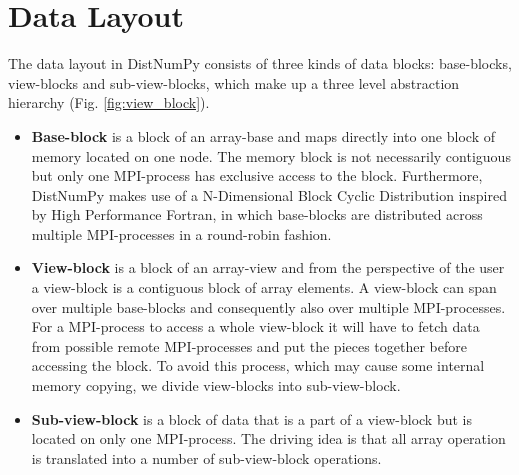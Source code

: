 \documentclass[preprint]{../PGAS10/sigplanconf}
\begin{document}
\section{Data Layout}
The data layout in DistNumPy consists of three kinds of data blocks: base-blocks, view-blocks and sub-view-blocks, which make up a three level abstraction hierarchy (Fig. \ref{fig:view_block}).

\begin{itemize}
\item \textbf{Base-block} is a block of an array-base and maps directly into one block of memory located on one node. The memory block is not necessarily contiguous but only one MPI-process has exclusive access to the block. Furthermore, DistNumPy makes use of a N-Dimensional Block Cyclic Distribution inspired by High Performance Fortran\cite{Loveman93}, in which base-blocks are distributed across multiple MPI-processes in a round-robin fashion.


\item \textbf{View-block} is a block of an array-view and from the perspective of the user a view-block is a contiguous block of array elements. A view-block can span over multiple base-blocks and consequently also over multiple MPI-processes. For a MPI-process to access a whole view-block it will have to fetch data from possible remote MPI-processes and put the pieces together before accessing the block. To avoid this process, which may cause some internal memory copying, we divide view-blocks into sub-view-block.

\item \textbf{Sub-view-block} is a block of data that is a part of a view-block but is located on only one MPI-process. The driving idea is that all array operation is translated into a number of sub-view-block operations.

\end{itemize}


\end{document}
